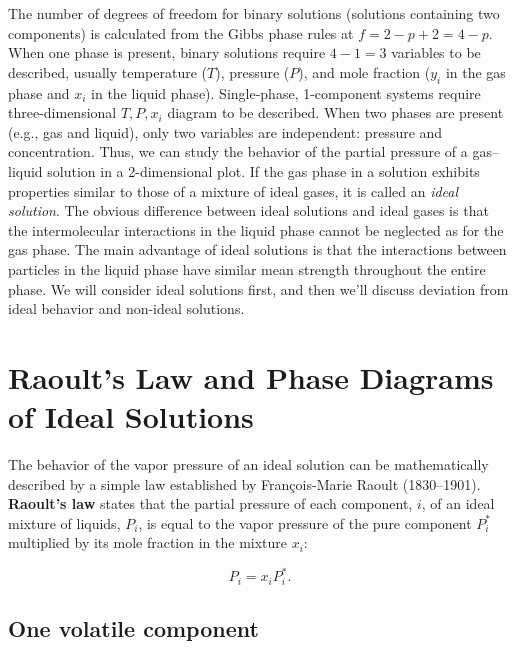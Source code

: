 \documentclass[
  9pt,
]{extbook}
\theoremstyle{definition}
\theoremstyle{definition}
\theoremstyle{definition}
\theoremstyle{remark}
\begin{document}
The number of degrees of freedom for binary solutions (solutions containing two components) is calculated from the Gibbs phase rules at \(f=2-p+2=4-p\). When one phase is present, binary solutions require \(4-1=3\) variables to be described, usually temperature (\(T\)), pressure (\(P\)), and mole fraction (\(y_i\) in the gas phase and \(x_i\) in the liquid phase). Single-phase, 1-component systems require three-dimensional \(T,P,x_i\) diagram to be described. When two phases are present (e.g., gas and liquid), only two variables are independent: pressure and concentration. Thus, we can study the behavior of the partial pressure of a gas--liquid solution in a 2-dimensional plot. If the gas phase in a solution exhibits properties similar to those of a mixture of ideal gases, it is called an \emph{ideal solution}. The obvious difference between ideal solutions and ideal gases is that the intermolecular interactions in the liquid phase cannot be neglected as for the gas phase. The main advantage of ideal solutions is that the interactions between particles in the liquid phase have similar mean strength throughout the entire phase. We will consider ideal solutions first, and then we'll discuss deviation from ideal behavior and non-ideal solutions.

\hypertarget{raoults-law-and-phase-diagrams-of-ideal-solutions}{%
\section{Raoult's Law and Phase Diagrams of Ideal Solutions}\label{raoults-law-and-phase-diagrams-of-ideal-solutions}}

The behavior of the vapor pressure of an ideal solution can be mathematically described by a simple law established by François-Marie Raoult (1830--1901). \textbf{Raoult's law} states that the partial pressure of each component, \(i\), of an ideal mixture of liquids, \(P_i\), is equal to the vapor pressure of the pure component \(P_i^*\) multiplied by its mole fraction in the mixture \(x_i\):

\begin{equation}
P_i=x_i P_i^*.
\label{eq:mc1}
\end{equation}

\hypertarget{one-volatile-component}{%
\subsection{One volatile component}\label{one-volatile-component}}
\end{document}
